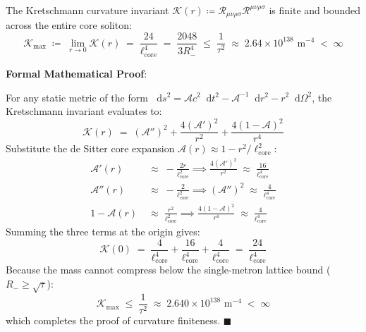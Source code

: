 \documentclass[
    12pt,
    a4paper,
    headings=normal,
    twoside=false,
    open=any,
    parskip=half
]{scrbook}
\newcommand{\diff}{\mathop{}\!\mathrm{d}}
\newenvironment{myproof}[1][]{%
  \par\vspace{6pt}\noindent\textbf{\sffamily\color{maincolor}Formal Mathematical Proof\ifstrempty{#1}{}{ (#1)}}:\par\nopagebreak
}{%
  \penalty50\hfill\ensuremath{\blacksquare}\par\vspace{6pt}
}
\begin{document}
\begin{phystheorem}\label{thm:ch9_kretschmann_finite_master}
The Kretschmann curvature invariant $\mathcal{K}(r) \coloneqq \mathcal{R}_{\mu\nu\rho\sigma}\mathcal{R}^{\mu\nu\rho\sigma}$ is finite and bounded across the entire core soliton:
\begin{equation}
\boxed{\mathcal{K}_{\max} \;\coloneqq\; \lim_{r \to 0} \mathcal{K}(r) \;=\; \frac{24}{\ell_{\text{core}}^4} \;=\; \frac{2048}{3 R_-^4} \;\le\; \frac{1}{\tau^2} \;\approx\; 2.64 \times 10^{138} \text{ m}^{-4} \;<\; \infty}
\label{eq:ch9_kretschmann_finite_master}
\end{equation}
\end{phystheorem}

\begin{myproof}
For any static metric of the form $\diff s^2 = \mathcal{A} c^2 \diff t^2 - \mathcal{A}^{-1}\diff r^2 - r^2\diff\Omega^2$, the Kretschmann invariant evaluates to:
\begin{equation*}
\mathcal{K}(r) \;=\; (\mathcal{A}'')^2 + \frac{4(\mathcal{A}')^2}{r^2} + \frac{4(1 - \mathcal{A})^2}{r^4}
\end{equation*}
Substitute the de Sitter core expansion $\mathcal{A}(r) \approx 1 - r^2/\ell_{\text{core}}^2$:
\begin{align*}
\mathcal{A}'(r) &\;\approx\; -\frac{2r}{\ell_{\text{core}}^2} \implies \frac{4(\mathcal{A}')^2}{r^2} \;\approx\; \frac{16}{\ell_{\text{core}}^4} \\
\mathcal{A}''(r) &\;\approx\; -\frac{2}{\ell_{\text{core}}^2} \implies (\mathcal{A}'')^2 \;\approx\; \frac{4}{\ell_{\text{core}}^4} \\
1 - \mathcal{A}(r) &\;\approx\; \frac{r^2}{\ell_{\text{core}}^2} \implies \frac{4(1 - \mathcal{A})^2}{r^4} \;\approx\; \frac{4}{\ell_{\text{core}}^4}
\end{align*}
Summing the three terms at the origin gives:
\begin{equation*}
\mathcal{K}(0) \;=\; \frac{4}{\ell_{\text{core}}^4} + \frac{16}{\ell_{\text{core}}^4} + \frac{4}{\ell_{\text{core}}^4} \;=\; \frac{24}{\ell_{\text{core}}^4}
\end{equation*}
Because the mass cannot compress below the single-metron lattice bound ($R_- \ge \sqrt{\tau}$):
\begin{equation*}
\mathcal{K}_{\max} \;\le\; \frac{1}{\tau^2} \;\approx\; 2.640 \times 10^{138} \text{ m}^{-4} \;<\; \infty
\end{equation*}
which completes the proof of curvature finiteness.
\end{myproof}
\end{document}
